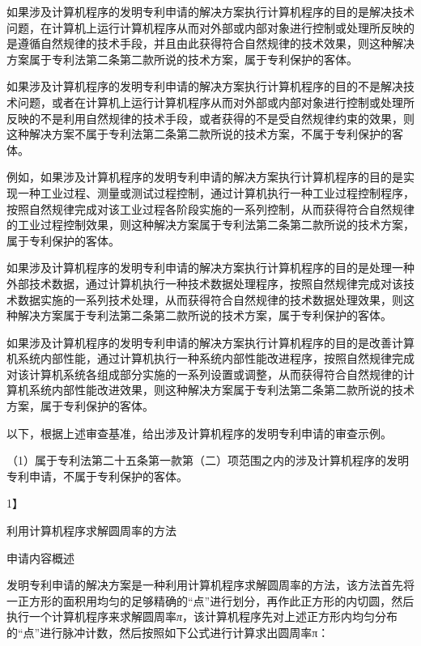 如果涉及计算机程序的发明专利申请的解决方案执行计算机程序的目的是解决技术问题，在计算机上运行计算机程序从而对外部或内部对象进行控制或处理所反映的是遵循自然规律的技术手段，并且由此获得符合自然规律的技术效果，则这种解决方案属于专利法第二条第二款所说的技术方案，属于专利保护的客体。

如果涉及计算机程序的发明专利申请的解决方案执行计算机程序的目的不是解决技术问题，或者在计算机上运行计算机程序从而对外部或内部对象进行控制或处理所反映的不是利用自然规律的技术手段，或者获得的不是受自然规律约束的效果，则这种解决方案不属于专利法第二条第二款所说的技术方案，不属于专利保护的客体。

例如，如果涉及计算机程序的发明专利申请的解决方案执行计算机程序的目的是实现一种工业过程、测量或测试过程控制，通过计算机执行一种工业过程控制程序，按照自然规律完成对该工业过程各阶段实施的一系列控制，从而获得符合自然规律的工业过程控制效果，则这种解决方案属于专利法第二条第二款所说的技术方案，属于专利保护的客体。

如果涉及计算机程序的发明专利申请的解决方案执行计算机程序的目的是处理一种外部技术数据，通过计算机执行一种技术数据处理程序，按照自然规律完成对该技术数据实施的一系列技术处理，从而获得符合自然规律的技术数据处理效果，则这种解决方案属于专利法第二条第二款所说的技术方案，属于专利保护的客体。

如果涉及计算机程序的发明专利申请的解决方案执行计算机程序的目的是改善计算机系统内部性能，通过计算机执行一种系统内部性能改进程序，按照自然规律完成对该计算机系统各组成部分实施的一系列设置或调整，从而获得符合自然规律的计算机系统内部性能改进效果，则这种解决方案属于专利法第二条第二款所说的技术方案，属于专利保护的客体。

以下，根据上述审查基准，给出涉及计算机程序的发明专利申请的审查示例。

{\setlength{\parindent}{17.1bp}（1）属于专利法第二十五条第一款第（二）项范围之内的涉及计算机程序的发明专利申请，不属于专利保护的客体。\par}

{1】\par}

利用计算机程序求解圆周率的方法

{\setlength{\parindent}{22.5bp}申请内容概述\par}

发明专利申请的解决方案是一种利用计算机程序求解圆周率的方法，该方法首先将一正方形的面积用均匀的足够精确的“点”进行划分，再作此正方形的内切圆，然后执行一个计算机程序来求解圆周率\textit{π}，该计算机程序先对上述正方形内均匀分布的“点”进行脉冲计数，然后按照如下公式进行计算求出圆周率π：

